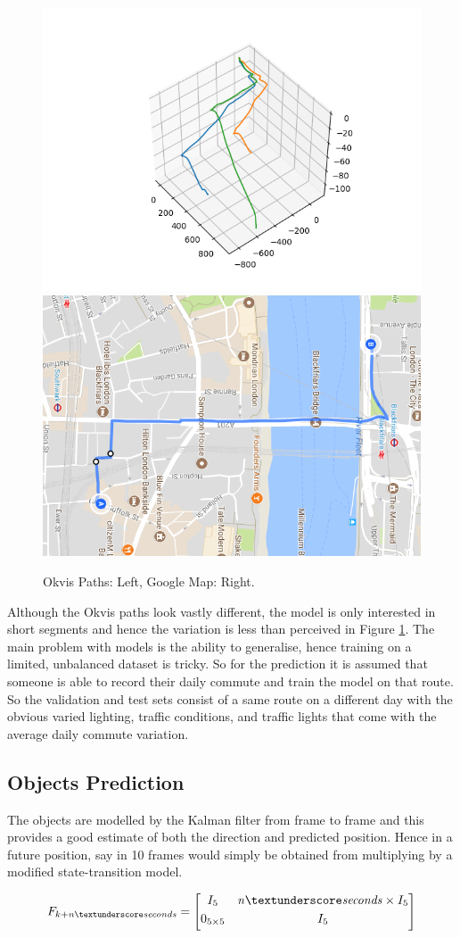 \documentclass[11pt,twoside]{report}
\begin{document}
\noindent \begin{figure}[h!]
	\includegraphics[width = 0.5\hsize]{figures/blackfriars_okvis_plot.png}
	\includegraphics[width = 0.5\hsize]{figures/blackfriars_map.png}
	\caption{Okvis Paths: Left, Google Map: Right.}
	\label{blackfriars_maps}
\end{figure}

Although the Okvis paths look vastly different, the model is only interested in short segments and hence the variation is less than perceived in Figure \ref{blackfriars_maps}. The main problem with models is the ability to generalise, hence training on a limited, unbalanced dataset is tricky. So for the prediction it is assumed that someone is able to record their daily commute and train the model on that route. So the validation and test sets consist of a same route on a different day with the obvious varied lighting, traffic conditions, and traffic lights that come with the average daily commute variation.

\subsection{Objects Prediction} \label{object_model}
The objects are modelled by the Kalman filter from frame to frame and this provides a good estimate of both the direction and predicted position. Hence in a future position, say in 10 frames would simply be obtained from multiplying by a modified state-transition model.

\begin{equation}
F_{k+\mathit{n \textunderscore seconds}} = 
\begin{bmatrix}
I_{5} & \mathit{n \textunderscore seconds} \times I_{5} \\[0.3em]

0_{5 \times 5} & I_{5} \\[0.3em]
\end{bmatrix}
\end{equation}
\end{document}
